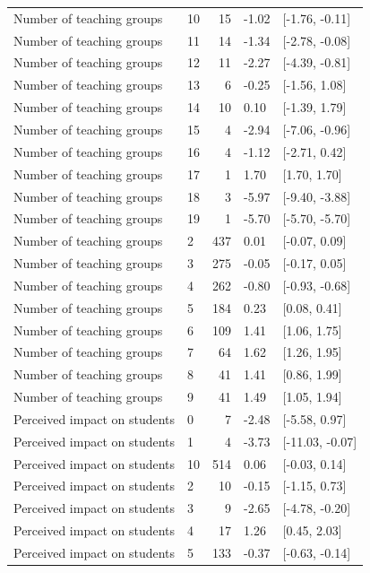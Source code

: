 \begin{tabular}{llrll}
Number of teaching groups & 10 & 15 & -1.02 & {}[-1.76, -0.11]\\
\addlinespace
Number of teaching groups & 11 & 14 & -1.34 & {}[-2.78, -0.08]\\
Number of teaching groups & 12 & 11 & -2.27 & {}[-4.39, -0.81]\\
Number of teaching groups & 13 & 6 & -0.25 & {}[-1.56, 1.08]\\
Number of teaching groups & 14 & 10 & 0.10 & {}[-1.39, 1.79]\\
Number of teaching groups & 15 & 4 & -2.94 & {}[-7.06, -0.96]\\
\addlinespace
Number of teaching groups & 16 & 4 & -1.12 & {}[-2.71, 0.42]\\
Number of teaching groups & 17 & 1 & 1.70 & {}[1.70, 1.70]\\
Number of teaching groups & 18 & 3 & -5.97 & {}[-9.40, -3.88]\\
Number of teaching groups & 19 & 1 & -5.70 & {}[-5.70, -5.70]\\
Number of teaching groups & 2 & 437 & 0.01 & {}[-0.07, 0.09]\\
\addlinespace
Number of teaching groups & 3 & 275 & -0.05 & {}[-0.17, 0.05]\\
Number of teaching groups & 4 & 262 & -0.80 & {}[-0.93, -0.68]\\
Number of teaching groups & 5 & 184 & 0.23 & {}[0.08, 0.41]\\
Number of teaching groups & 6 & 109 & 1.41 & {}[1.06, 1.75]\\
Number of teaching groups & 7 & 64 & 1.62 & {}[1.26, 1.95]\\
\addlinespace
Number of teaching groups & 8 & 41 & 1.41 & {}[0.86, 1.99]\\
Number of teaching groups & 9 & 41 & 1.49 & {}[1.05, 1.94]\\
Perceived impact on students & 0 & 7 & -2.48 & {}[-5.58, 0.97]\\
Perceived impact on students & 1 & 4 & -3.73 & {}[-11.03, -0.07]\\
Perceived impact on students & 10 & 514 & 0.06 & {}[-0.03, 0.14]\\
\addlinespace
Perceived impact on students & 2 & 10 & -0.15 & {}[-1.15, 0.73]\\
Perceived impact on students & 3 & 9 & -2.65 & {}[-4.78, -0.20]\\
Perceived impact on students & 4 & 17 & 1.26 & {}[0.45, 2.03]\\
Perceived impact on students & 5 & 133 & -0.37 & {}[-0.63, -0.14]\\

\end{tabular}
